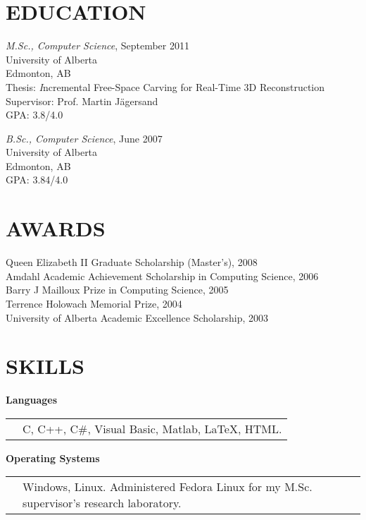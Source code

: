 \documentclass{res}
\begin{document}
\begin{resume}
\section{EDUCATION}
    \textit{M.Sc., Computer Science}, September 2011\\
    University of Alberta\\
    Edmonton, AB\\
    \hspace*{2.5em} Thesis: {\textit Incremental Free-Space Carving for Real-Time 3D Reconstruction}\\
    \hspace*{2.5em} Supervisor: Prof. Martin J{\"a}gersand\\
    \hspace*{2.5em} GPA: 3.8/4.0

    \textit{B.Sc., Computer Science}, June 2007\\
    University of Alberta\\
    Edmonton, AB\\
    \hspace*{2.5em} GPA: 3.84/4.0


\section{AWARDS}
    Queen Elizabeth II Graduate Scholarship (Master's), 2008\\
    Amdahl Academic Achievement Scholarship in Computing Science, 2006\\
    Barry J Mailloux Prize in Computing Science, 2005\\
    Terrence Holowach Memorial Prize, 2004\\
    University of Alberta Academic Excellence Scholarship, 2003


\section{SKILLS}
    \textbf{Languages}\\
    \begin{tabular}{ l L{5.5in} }
    \hspace*{1.2em} & C, C++, C\#, Visual Basic, Matlab, LaTeX, HTML. \\
    \end{tabular}

    \textbf{Operating Systems}\\
    \begin{tabular}{ l L{5.5in} }
    \hspace*{1.2em} & Windows, Linux.  Administered Fedora Linux for my M.Sc. supervisor's research laboratory.\\
    \end{tabular}


\end{resume}
\end{document}
